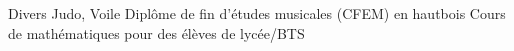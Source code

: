 \begin{rubric}{Divers}
  Judo, Voile
  Diplôme de fin d'études musicales (CFEM) en hautbois
  Cours de mathématiques pour des élèves de lycée/BTS
\end{rubric}
